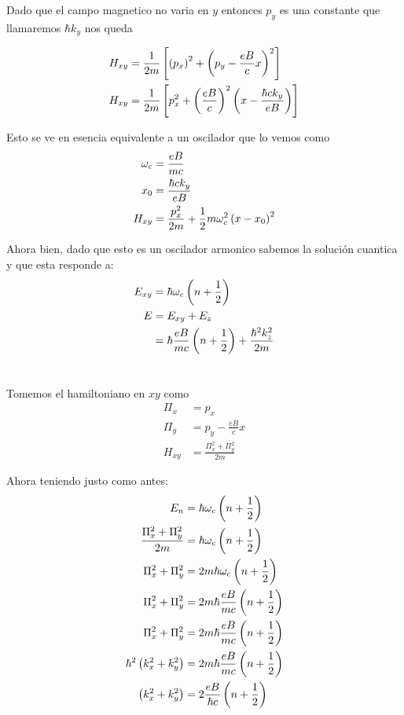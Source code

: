 \documentclass{report}
\begin{document}
Dado que el campo magnetico no varia en $y$ entonces $p_y$ es una constante que llamaremos $\hbar k_y$ nos queda

\begin{align*}
  H_{xy} &= \frac{1}{2m} \left[\left(p_x\right)^2 + \left(p_y - \frac{eB}{c}x\right)^2\right]\\
  H_{xy} &= \frac{1}{2m} \left[p_x^2 + \left(\frac{eB}{c}\right)^2\left(x - \frac{\hbar ck_y}{eB}\right)\right]
\end{align*}

Esto se ve en esencia equivalente a un oscilador que lo vemos como
\begin{align*}
  \omega_c &= \frac{eB}{mc}\\
  x_0 &= \frac{\hbar c k_y}{eB}\\
  H_{xy} &= \frac{p_x^2}{2m} + \frac{1}{2}m\omega_c^2 \left(x - x_0\right)^2
\end{align*}

Ahora bien, dado que esto es un oscilador armonico sabemos la solución cuantica y que esta responde a:
\begin{align*}
  E_{xy} &= \hbar\omega_c\left(n + \frac{1}{2}\right)\\
  E &= E_{xy} + E_z\\
  &= \hbar\frac{eB}{mc}\left(n + \frac{1}{2}\right) + \frac{\hbar^2k_z^2}{2m}
\end{align*}

\section{}

Tomemos el hamiltoniano en $xy$ como
\begin{align*}
  \Pi_x &= p_x\\
  \Pi_y &= p_y - \frac{e B}{c}x\\
  H_{xy} &= \frac{\Pi_x^2 + \Pi_y^2}{2m}
\end{align*}

Ahora teniendo justo como antes:
\begin{align*}
  E_n &= \hbar\omega_c\left(n + \frac{1}{2}\right)\\
  \frac{\Pi_x^2 + \Pi_y^2}{2m} &= \hbar\omega_c\left(n + \frac{1}{2}\right)\\
  \Pi_x^2 + \Pi_y^2 &= 2m\hbar\omega_c\left(n + \frac{1}{2}\right)\\
  \Pi_x^2 + \Pi_y^2 &= 2m\hbar\frac{eB}{mc}\left(n + \frac{1}{2}\right)\\
  \Pi_x^2 + \Pi_y^2 &= 2m\hbar\frac{eB}{mc}\left(n + \frac{1}{2}\right)\\
  \hbar^2\left(k_x^2 + k_y^2\right) &= 2m\hbar\frac{eB}{mc}\left(n + \frac{1}{2}\right)\\
  \left(k_x^2 + k_y^2\right) &= 2\frac{eB}{\hbar c}\left(n + \frac{1}{2}\right)\\
\end{align*}
\end{document}

